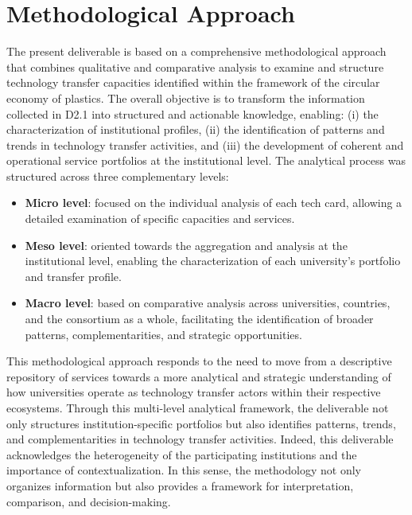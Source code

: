 \documentclass[
  12pt,
  oneside]{book}
\providecommand{\tightlist}{%
  \setlength{\itemsep}{0pt}\setlength{\parskip}{0pt}}
\begin{document}
\chapter{Methodological Approach}\label{methodological-approach}

The present deliverable is based on a comprehensive methodological
approach that combines qualitative and comparative analysis to examine
and structure technology transfer capacities identified within the
framework of the circular economy of plastics. The overall objective is
to transform the information collected in D2.1 into structured and
actionable knowledge, enabling: (i) the characterization of
institutional profiles, (ii) the identification of patterns and trends
in technology transfer activities, and (iii) the development of coherent
and operational service portfolios at the institutional level. The
analytical process was structured across three complementary levels:

\begin{itemize}
\tightlist
\item
  \textbf{Micro level}: focused on the individual analysis of each tech
  card, allowing a detailed examination of specific capacities and
  services.
\item
  \textbf{Meso level}: oriented towards the aggregation and analysis at
  the institutional level, enabling the characterization of each
  university's portfolio and transfer profile.
\item
  \textbf{Macro level}: based on comparative analysis across
  universities, countries, and the consortium as a whole, facilitating
  the identification of broader patterns, complementarities, and
  strategic opportunities.
\end{itemize}

This methodological approach responds to the need to move from a
descriptive repository of services towards a more analytical and
strategic understanding of how universities operate as technology
transfer actors within their respective ecosystems. Through this
multi-level analytical framework, the deliverable not only structures
institution-specific portfolios but also identifies patterns, trends,
and complementarities in technology transfer activities. Indeed, this
deliverable acknowledges the heterogeneity of the participating
institutions and the importance of contextualization. In this sense, the
methodology not only organizes information but also provides a framework
for interpretation, comparison, and decision-making.
\end{document}
